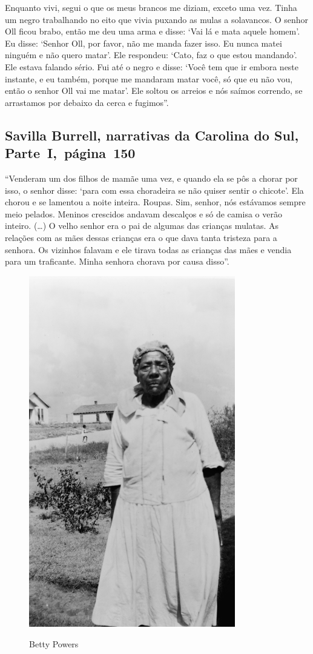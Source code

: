 Enquanto vivi, segui o que os meus brancos me diziam, exceto uma vez.
Tinha um negro trabalhando no eito que vivia puxando as mulas a
solavancos. O senhor Oll ficou brabo, então me deu uma arma e disse:
`Vai lá e mata aquele homem'. Eu disse: `Senhor Oll, por favor, não me
manda fazer isso. Eu nunca matei ninguém e não quero matar'. Ele
respondeu: `Cato, faz o que estou mandando'. Ele estava falando sério.
Fui até o negro e disse: `Você tem que ir embora neste instante, e eu
também, porque me mandaram matar você, só que eu não vou, então o senhor
Oll vai me matar'. Ele soltou os arreios e nós saímos correndo, se
arrastamos por debaixo da cerca e fugimos''.

\subsection{Savilla Burrell, narrativas da Carolina do Sul, Parte~I,~página~150} \label{ref39}

``Venderam um dos filhos de mamãe uma vez, e quando ela se pôs a chorar
por isso, o senhor disse: `para com essa choradeira se não quiser sentir
o chicote'. Ela chorou e se lamentou a noite inteira. Roupas. Sim,
senhor, nós estávamos sempre meio pelados. Meninos crescidos andavam
descalços e só de camisa o verão inteiro. (\ldots{}) O velho senhor era
o pai de algumas das crianças mulatas. As relações com as mães dessas
crianças era o que dava tanta tristeza para a senhora. Os vizinhos
falavam e ele tirava todas as crianças das mães e vendia para um
traficante. Minha senhora chorava por causa disso''.

\begin{figure}[]
\centering
 \includegraphics[width=90mm]{./imgs/bettypowers_recorte.jpg} \label{img11}
\caption{Betty Powers}
\end{figure}

